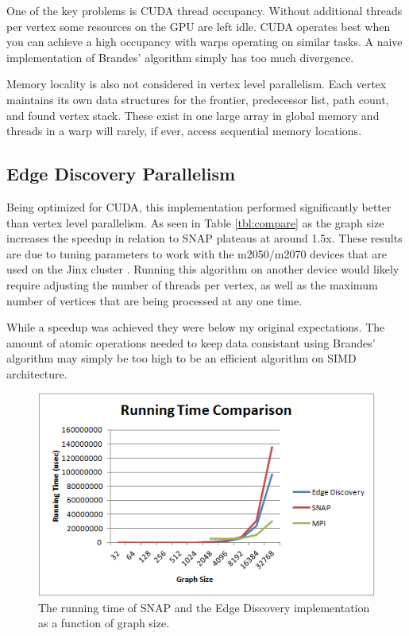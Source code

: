 \documentclass[10pt,twocolumn]{article}
\begin{document}
One of the key problems is CUDA thread occupancy. Without additional threads per vertex some resources on the GPU are left idle. CUDA operates best when you can achieve a high occupancy with warps operating on similar tasks. A naive implementation of Brandes' algorithm simply has too much divergence.

Memory locality is also not considered in vertex level parallelism. Each vertex maintains its own data structures for the frontier, predecessor list, path count, and found vertex stack. These exist in one large array in global memory and threads in a warp will rarely, if ever, access sequential memory locations.

\subsection{Edge Discovery Parallelism}
Being optimized for CUDA, this implementation performed significantly better than vertex level parallelism. As seen in Table \ref{tbl:compare} as the graph size increases the speedup in relation to SNAP plateaus at around 1.5x. These results are due to tuning parameters to work with the m2050/m2070 devices that are used on the Jinx cluster \cite{jinx}. Running this algorithm on another device would likely require adjusting the number of threads per vertex, as well as the maximum number of vertices that are being processed at any one time.

While a speedup was achieved they were below my original expectations. The amount of atomic operations needed to keep data consistant using Brandes' algorithm may simply be too high to be an efficient algorithm on SIMD architecture.

\begin{figure}[htbp]
\centering
\includegraphics[scale=.6]{runningTime.png}
\caption{The running time of SNAP and the Edge Discovery implementation as a function of graph size.}
\label{fig:runningTime}
\end{figure}
\end{document}
